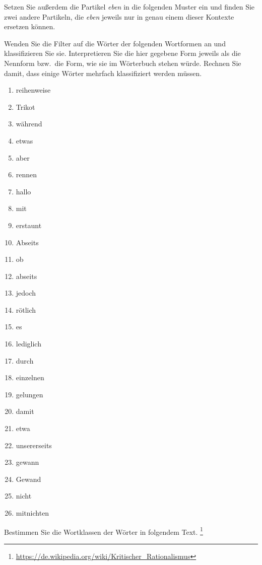 Setzen Sie außerdem die Partikel \textit{eben} in die folgenden Muster ein und finden Sie zwei andere Partikeln, die \textit{eben} jeweils nur in genau einem dieser Kontexte ersetzen können.

\begin{exe}
\end{exe}

\Uebung \label{u55} Wenden Sie die Filter auf die Wörter der folgenden Wortformen an und klassifizieren Sie sie.
Interpretieren Sie die hier gegebene Form jeweils als die Nennform bzw.\ die Form, wie sie im Wörterbuch stehen würde.
Rechnen Sie damit, dass einige Wörter mehrfach klassifiziert werden müssen.

\begin{enumerate}\Lf
  \item reihenweise
  \item Trikot
  \item während
  \item etwas
  \item aber
  \item rennen
  \item hallo
  \item mit
  \item erstaunt
  \item Abseits
  \item ob
  \item abseits
  \item jedoch
  \item rötlich
  \item es
  \item lediglich
  \item durch
  \item einzelnen
  \item gelungen
  \item damit
  \item etwa
  \item unsererseits
  \item gewann
  \item Gewand
  \item nicht
  \item mitnichten
\end{enumerate}

\Uebung \label{u56} Bestimmen Sie die Wortklassen der Wörter in folgendem Text.%
\footnote{\url{https://de.wikipedia.org/wiki/Kritischer_Rationalismus}}

